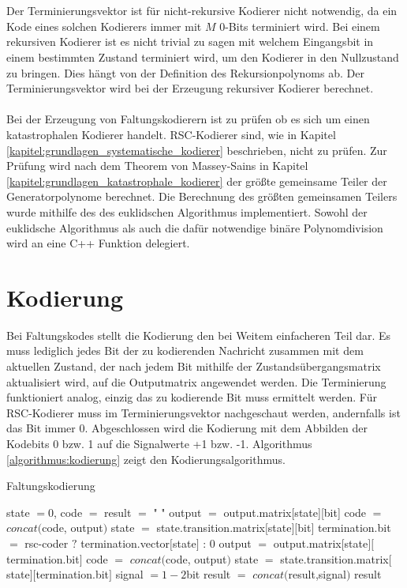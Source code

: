 \\
\\
Der Terminierungsvektor ist für nicht-rekursive Kodierer nicht notwendig, da ein Kode eines solchen Kodierers immer mit $M$ 0-Bits terminiert wird. Bei einem rekursiven Kodierer ist es nicht trivial zu sagen mit welchem Eingangsbit in einem bestimmten Zustand terminiert wird, um den Kodierer in den Nullzustand zu bringen. Dies hängt von der Definition des Rekursionpolynoms ab. Der Terminierungsvektor wird bei der Erzeugung rekursiver Kodierer berechnet.
\\
\\
Bei der Erzeugung von Faltungskodierern ist zu prüfen ob es sich um einen katastrophalen Kodierer handelt. RSC-Kodierer sind, wie in Kapitel \ref{kapitel:grundlagen_systematische_kodierer} beschrieben, nicht zu prüfen. Zur Prüfung wird nach dem Theorem von Massey-Sains in Kapitel \ref{kapitel:grundlagen_katastrophale_kodierer} der größte gemeinsame Teiler der Generatorpolynome berechnet. Die Berechnung des größten gemeinsamen Teilers wurde mithilfe des des euklidschen Algorithmus implementiert. Sowohl der euklidsche Algorithmus als auch die dafür notwendige binäre Polynomdivision wird an eine C++ Funktion delegiert.

\section{Kodierung}
\label{kapitel:implementierung_kodierung}
Bei Faltungskodes stellt die Kodierung den bei Weitem einfacheren Teil dar. Es muss lediglich jedes Bit der zu kodierenden Nachricht zusammen mit dem aktuellen Zustand, der nach jedem Bit mithilfe der Zustandsübergangsmatrix aktualisiert wird, auf die Outputmatrix angewendet werden. Die Terminierung funktioniert analog, einzig das zu kodierende Bit muss ermittelt werden. Für RSC-Kodierer muss im Terminierungsvektor nachgeschaut werden, andernfalls ist das Bit immer 0. Abgeschlossen wird die Kodierung mit dem Abbilden der Kodebits 0 bzw. 1 auf die Signalwerte +1 bzw. -1. Algorithmus \ref{algorithmus:kodierung} zeigt den Kodierungsalgorithmus.

\begin{algorithm}[H]
\renewcommand{\algorithmicforall}{\textbf{for each}}
\caption{Faltungskodierung}
\label{algorithmus:kodierung}
\begin{algorithmic}[1]
\STATE state $=0$, code $=$ result $=$ " "
   \STATE output $=$ output.matrix[state][bit]
	\STATE code $=$ $concat($code, output$)$
	\STATE state $=$ state.transition.matrix$[$state$][$bit$]$
\ENDFOR
{}
      \STATE termination.bit $=$ rsc-coder $?$ termination.vector$[$state$]$ : $0$
      \STATE output $=$ output.matrix$[$state$][$termination.bit$]$
	   \STATE code $=$ $concat($code, output$)$
	   \STATE state $=$ state.transition.matrix$[$state$][$termination.bit$]$
   \ENDFOR
\ENDIF
{}
   \STATE signal $=1-2$bit
   \STATE result $=$ $concat($result,signal$)$
\ENDFOR
\RETURN result
\end{algorithmic}
\end{algorithm}

